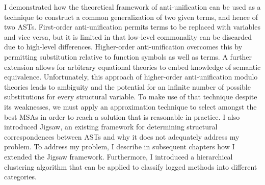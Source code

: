 I demonstrated how the theoretical framework of anti-unification can be used as a technique to construct a common generalization of two given terms, and hence of two ASTs.  First-order anti-unification permits terms to be replaced with variables and vice versa, but it is limited in that low-level commonality can be discarded due to high-level differences.  Higher-order anti-unification overcomes this by permitting substitution relative to function symbols as well as terms. A further extension allows for arbitrary equational theories to embed knowledge of semantic equivalence.  Unfortunately, this approach of higher-order anti-unification modulo theories leads to ambiguity and the potential for an infinite number of possible substitutions for every structural variable.  To make use of that technique despite its weaknesses, we must apply an approximation technique to select amongst the best MSAs in order to reach a solution that is reasonable in practice. I also introduced Jigsaw, an existing framework for determining structural correspondences between ASTs and why it does not adequately address my problem.  To address my problem, I describe in subsequent chapters how I extended the Jigsaw framework. Furthermore, I introduced a hierarchical clustering algorithm that can be applied to classify logged methods into different categories.


